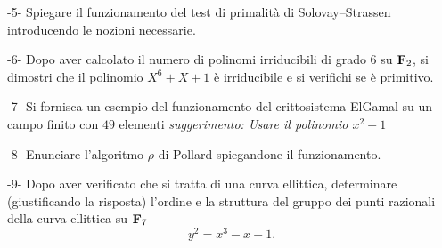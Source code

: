 \item{-5-} Spiegare il funzionamento del test di primalit\`{a} di Solovay--Strassen introducendo le
nozioni necessarie.

\ve\vs

\item{-6-}  Dopo aver calcolato il numero di polinomi irriducibili di grado 6 su ${\bf F}_{2}$, si dimostri
che il polinomio $X^6+X+1$ \`e irriducibile e si verifichi se \`e primitivo.
\vv

\item{-7-}  Si fornisca un esempio del funzionamento del crittosistema ElGamal su un campo finito con
$49$ elementi \hfill {\it suggerimento: Usare il polinomio $x^2+1$}

\ve \vs

\item{-8-} 
Enunciare l'algoritmo $\rho$ di Pollard spiegandone il funzionamento.
\vv

\item{-9-} Dopo aver verificato che si tratta di una curva ellittica, determinare (giustificando la risposta) l'ordine e la struttura del gruppo
dei punti razionali della curva ellittica su ${\bf F}_7$
$$y^2 = x^3 - x + 1.$$
\ \vst

 \bye
